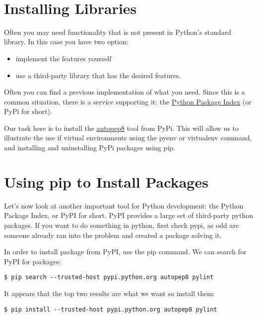 \FILENAME\

\section{Installing Libraries}\label{installing-libraries}

Often you may need functionality that is not present in Python's
standard library. In this case you have two option:

\begin{itemize}
\item  implement the features yourself
\item  use a third-party library that has the desired features.
\end{itemize}

Often you can find a previous implementation of what you need. Since
this is a common situation, there is a service supporting it: the
\href{https://pypi.python.org/pypi}{Python Package Index} (or PyPi for
short).

Our task here is to install the \href{}{autopep8} tool from PyPi. This
will allow us to illustrate the use if virtual environments using the
pyenv or virtualenv command, and installing and uninstalling PyPi
packages using pip.

\section{Using pip to Install
Packages}\label{using-pip-to-install-packages}

Let's now look at another important tool for Python development: the
Python Package Index, or PyPI for short. PyPI provides a large set of
third-party python packages. If you want to do something in python,
first check pypi, as odd are someone already ran into the problem and
created a package solving it.

In order to install package from PyPI, use the pip command. We can
search for PyPI for packages:

\begin{verbatim}
$ pip search --trusted-host pypi.python.org autopep8 pylint
\end{verbatim}

It appears that the top two results are what we want so install them:

\begin{verbatim}
$ pip install --trusted-host pypi.python.org autopep8 pylint
\end{verbatim}

